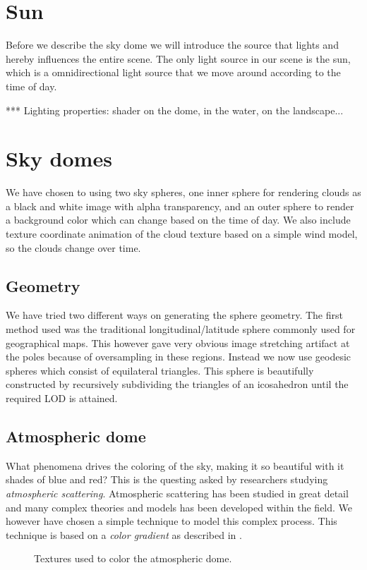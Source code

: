 \section{Sun}
Before we describe the sky dome we will introduce the source that lights
and hereby influences the entire scene. The only light source in our
scene is the sun, which is a omnidirectional light source that we move
around according to the time of day.

*** Lighting properties: shader on the dome, in the water, on the landscape...

\section{Sky domes}
We have chosen to using two sky spheres, one inner sphere for
rendering clouds as a black and white image with alpha transparency,
and an outer sphere to render a background color which can change
based on the time of day. We also include texture coordinate animation
of the cloud texture based on a simple wind model, so the clouds
change over time.

\subsection{Geometry}
We have tried two different ways on generating the sphere
geometry. The first method used was the traditional longitudinal/latitude
sphere commonly used for geographical maps. This
however gave very obvious image stretching artifact at the poles
because of oversampling in these regions. Instead we now use geodesic
spheres which consist of equilateral triangles. This sphere is
beautifully constructed by recursively subdividing the triangles of an
icosahedron until the required LOD is attained.

\subsection{Atmospheric dome}
What phenomena drives the coloring of the sky, making it so beautiful
with it shades of blue and red?
This is the questing asked by researchers studying 
\emph{atmospheric scattering}. Atmospheric scattering has been studied
in great detail and many complex theories and models has been
developed within the field. We however have chosen a simple technique
to model this complex process. This technique is based on a
\emph{color gradient} as described in .

\begin{figure}[!h]
  \centering
  \hspace{8mm}
  \caption{Textures used to color the atmospheric dome.}
  \label{fig:atmosphere}
\end{figure}

